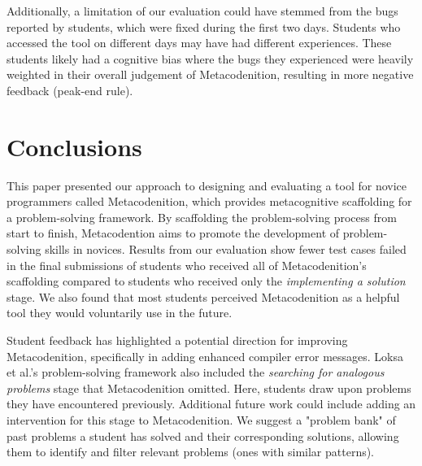 \documentclass[sigconf,authorversion,nonacm]{acmart}
\begin{document}
Additionally, a limitation of our evaluation could have stemmed from the bugs reported by students, which were fixed during the first two days. Students who accessed the tool on different days may have had different experiences. These students likely had a cognitive bias where the bugs they experienced were heavily weighted in their overall judgement of Metacodenition, resulting in more negative feedback (peak-end rule).

\section{Conclusions}
This paper presented our approach to designing and evaluating a tool for novice programmers called Metacodenition, which provides metacognitive scaffolding for a problem-solving framework. By scaffolding the problem-solving process from start to finish, Metacodention aims to promote the development of problem-solving skills in novices. Results from our evaluation show fewer test cases failed in the final submissions of students who received all of Metacodenition's scaffolding compared to students who received only the \emph{implementing a solution} stage. We also found that most students perceived Metacodenition as a helpful tool they would voluntarily use in the future. 

Student feedback has highlighted a potential direction for improving Metacodenition, specifically in adding enhanced compiler error messages. Loksa et al.'s problem-solving framework also included the \emph{searching for analogous problems} stage that Metacodenition omitted. Here, students draw upon problems they have encountered previously. Additional future work could include adding an intervention for this stage to Metacodenition. We suggest a "problem bank" of past problems a student has solved and their corresponding solutions, allowing them to identify and filter relevant problems (ones with similar patterns).



\end{document}

